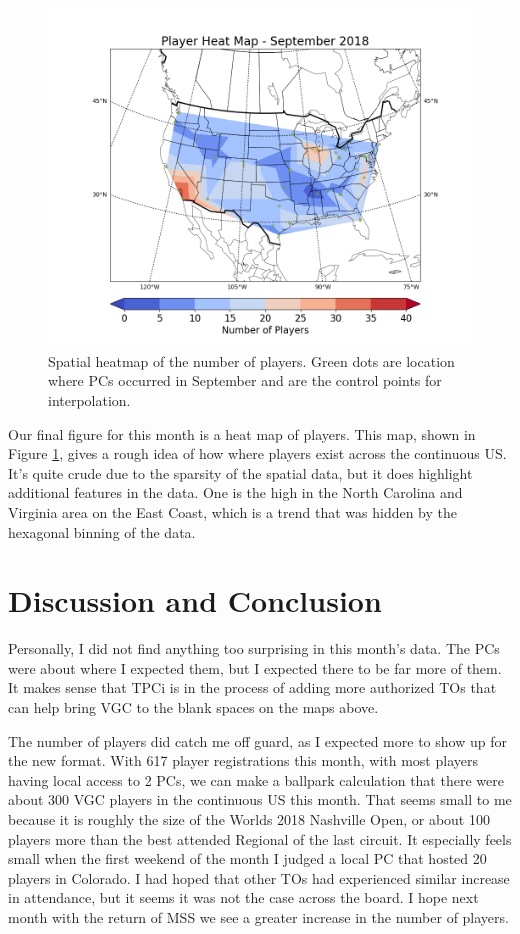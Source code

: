 \documentclass[11pt,twocolumn]{article}
\begin{document}
\begin{figure}[ht]
	\includegraphics[width=\columnwidth]{../figs/Figure_4.png}
	\caption{Spatial heatmap of the number of players. Green dots are location where PCs occurred in September and are the control points for interpolation.}
	\label{fig4}
\end{figure}

Our final figure for this month is a heat map of players. This map, shown in Figure \ref{fig4}, gives a rough idea of how where players exist across the continuous US. It's quite crude due to the sparsity of the spatial data, but it does highlight additional features in the data. One is the high in the North Carolina and Virginia area on the East Coast, which is a trend that was hidden by the hexagonal binning of the data.

\section*{Discussion and Conclusion}

Personally, I did not find anything too surprising in this month's data. The PCs were about where I expected them, but I expected there to be far more of them. It makes sense that TPCi is in the process of adding more authorized TOs that can help bring VGC to the blank spaces on the maps above. 

The number of players did catch me off guard, as I expected more to show up for the new format. With 617 player registrations this month, with most players having local access to 2 PCs, we can make a ballpark calculation that there were about 300 VGC players in the continuous US this month. That seems small to me because it is roughly the size of the Worlds 2018 Nashville Open, or about 100 players more than the best attended Regional of the last circuit. It especially feels small when the first weekend of the month I judged a local PC that hosted 20 players in Colorado. I had hoped that other TOs had experienced similar increase in attendance, but it seems it was not the case across the board. I hope next month with the return of MSS we see a greater increase in the number of players.
\end{document}
